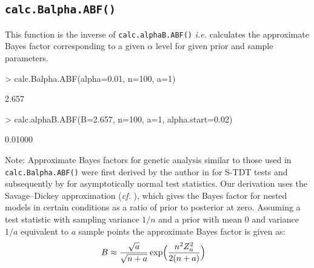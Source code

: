 \documentclass[a4paper,10pt]{amsart}
\def\ie{\textit{i.e.}}
\def\cf{\textit{cf.}}
\begin{document}
\subsection{\texttt{calc.Balpha.ABF()}}
This function is the inverse of
\texttt{calc.alphaB.ABF()} \ie{}
calculates the approximate Bayes factor corresponding
to a given $\alpha$ level for given prior and sample parameters.
\begin{Schunk}
\begin{Sinput}
> calc.Balpha.ABF(alpha=0.01, n=100, a=1)
\end{Sinput}
\begin{Soutput}
[1] 2.657
\end{Soutput}
\begin{Sinput}
> calc.alphaB.ABF(B=2.657, n=100, a=1, alpha.start=0.02)
\end{Sinput}
\begin{Soutput}
[1] 0.01000
\end{Soutput}
\end{Schunk}

Note: Approximate Bayes factors for genetic analysis similar to those
used in \texttt{calc.Balpha.ABF()} were first derived by the author in
\cite[p166--167]{Ball2007AssocMapInPlantsCh8} for S-TDT tests and
subsequently by \cite{WakefieldApproxBF2007} for asymptotically normal
test statistics. Our derivation uses the Savage--Dickey approximation
(\cf{} \cite{Ball2011exptdesigngwcc}), which gives the Bayes factor for
nested models in certain conditions as a ratio of prior to posterior
at zero. Assuming a test statistic with sampling variance $1/n$ and a
prior with mean $0$ and variance $1/a$ equivalent to $a$ sample points
the approximate Bayes factor is given as:
\begin{align}
\label{eq:abf}
B  &\approx \frac{\sqrt{a}}{\sqrt{n+a}}\exp\Bigl(\frac{n^2 Z_n^2}{2(n+a)}\Bigr)
\end{align}
\end{document}
